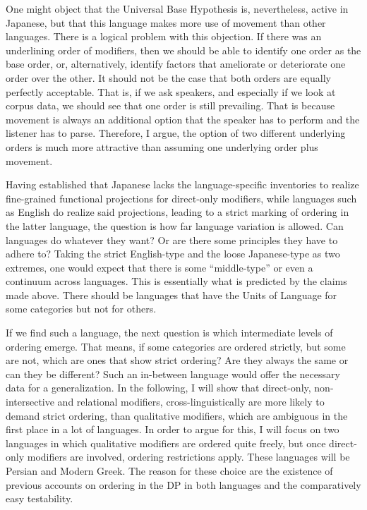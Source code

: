 One might object that the Universal Base Hypothesis is, nevertheless, active in Japanese, but that this language makes more use of movement than other languages. There is a logical problem with this objection. If there was an underlining order of modifiers, then we should be able to identify one order as the base order, or, alternatively, identify factors that ameliorate or deteriorate one order over the other. It should not be the case that both orders are equally perfectly acceptable. That is, if we ask speakers, and especially if we look at corpus data, we should see that one order is still prevailing. That is because movement is always an additional option that the speaker has to perform and the listener has to parse. Therefore, I argue, the option of two different underlying orders is much more attractive than assuming one underlying order plus movement.  

Having established that Japanese lacks the language-specific inventories to realize fine-grained functional projections for direct-only modifiers, while languages such as English do realize said projections, leading to a strict marking of ordering in the latter language, the question is how far language variation is allowed. Can languages do whatever they want? Or are there some principles they have to adhere to? Taking the strict English-type and the loose Japanese-type as two extremes, one would expect that there is some ``middle-type'' or even a continuum across languages. This is essentially what is predicted by the claims made above. There should be languages that have the Units of Language for some categories but not for others.

If we find such a language, the next question is which intermediate levels of ordering emerge. That means, if some categories are ordered strictly, but some are not, which are ones that show strict ordering? Are they always the same or can they be different? Such an in-between language would offer the necessary data for a generalization. In the following, I will show that direct-only, non-intersective and relational modifiers, cross-linguistically are more likely to demand strict ordering, than qualitative modifiers, which are ambiguous in the first place in a lot of languages. In order to argue for this, I will focus on two languages in which qualitative modifiers are ordered quite freely, but once direct-only modifiers are involved, ordering restrictions apply. These languages will be Persian and Modern Greek. The reason for these choice are the existence of previous accounts on ordering in the DP in both languages and the comparatively easy testability.

